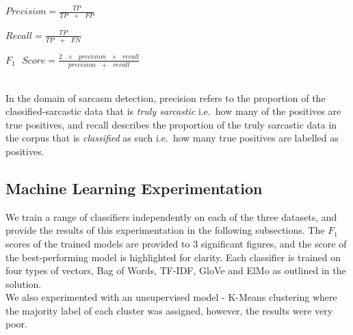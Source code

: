 \documentclass[12pt,a4paper]{article}
\begin{document}
\begin{minipage}{0.33\textwidth}
	$Precision =\frac{TP}{TP\text{ } + \text{ }FP}$
\end{minipage}
\begin{minipage}{0.28\textwidth}
	$Recall =\frac{TP}{TP\text{ } + \text{ }FN}$
\end{minipage}
\begin{minipage}{0.33\textwidth}
	$F_1\text{ } Score =\frac{2 \text{ }\times\text{ } precision\text{ } \times \text{ }recall}{precision\text{ } + \text{ }recall}$
\end{minipage}\\

\noindent In the domain of sarcasm detection, precision refers to the proportion of the classified-sarcastic data that is \textit{truly sarcastic} i.e.\ how many of the positives are true positives, and recall describes the proportion of the truly sarcastic data in the corpus that is \textit{classified} as such i.e.\ how many true positives are labelled as positives. \\



\subsection{Machine Learning Experimentation}


\noindent We train a range of classifiers independently on each of the three datasets, and provide the results of this experimentation in the following subsections. The $F_{1}$ scores of the trained models are provided to 3 significant figures, and the score of the best-performing model is highlighted for clarity. Each classifier is trained on four types of vectors, Bag of Words, TF-IDF, GloVe and ElMo as outlined in the solution.\\

\noindent We also experimented with an unsupervised model - K-Means clustering where the majority label of each cluster was assigned, however, the results were very poor.\\
\end{document}
